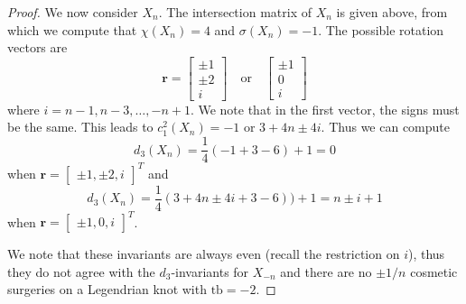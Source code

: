 \documentclass[12pt]{amsart}
\theoremstyle{definition}
\theoremstyle{definition}
\newcommand{\tb}{\text{tb}}
\begin{document}
\begin{proof}
			We now consider $X_n$. The intersection matrix of $X_n$ is given above, from which we compute that $\chi(X_n)=4$ and $\sigma(X_n)=-1$. 
			The possible rotation vectors are
			\[
			\mathbf{r}=
			\begin{bmatrix}
				\pm 1\\
				\pm 2\\
				i
			\end{bmatrix}
			\quad \text{or}\quad
			\begin{bmatrix}
				\pm 1\\ 
				0\\
				i
			\end{bmatrix}
			\]
			where $i=n-1, n-3, \ldots, -n+1$. We note that in the first vector, the signs must be the same. This leads to $c_1^2(X_n)= -1$ or $3+4n\pm 4i$.
			Thus we can compute 
			\[
			d_3(X_n)= \frac 14(-1+3-6)+1=0
			\]
			when $\mathbf{r}=
			\begin{bmatrix}
				\pm 1,
				\pm 2, 
				i
			\end{bmatrix}^T$ and
			\[
			d_3(X_n)=\frac 14(3+4n\pm 4i+3-6))+1=n\pm i+1
			\]
			when $\mathbf{r}=
			\begin{bmatrix}
				\pm 1,
				0, 
				i
			\end{bmatrix}^T$.
		
			We note that these invariants are always even (recall the restriction on $i$), thus they do not agree with the $d_3$-invariants for $X_{-n}$ and there are no $\pm 1/n$ cosmetic surgeries on a Legendrian knot with $\tb=-2$.
		\end{proof}
		
\end{document}
